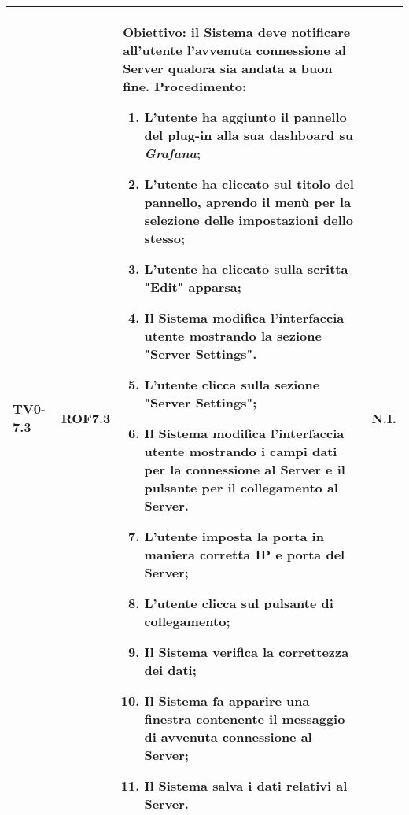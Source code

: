 \begin{longtable}{|C{.15\textwidth}|C{.13\textwidth}|m{.52\textwidth}|C{.08\textwidth}|}
TV0-7.3 & ROF7.3 &
	\textbf{Obiettivo}: il Sistema deve notificare all'utente l'avvenuta connessione al Server qualora sia andata a buon fine. \newline
	\textbf{Procedimento}:
	\begin{enumerate}
		\item L'utente ha aggiunto il pannello del plug-in alla sua dashboard su \textit{Grafana};
		\item L'utente ha cliccato sul titolo del pannello, aprendo il menù per la selezione delle impostazioni dello stesso;
		\item L'utente ha cliccato sulla scritta "Edit" apparsa;
		\item Il Sistema modifica l'interfaccia utente mostrando la sezione "Server Settings".
		\item L'utente clicca sulla sezione "Server Settings";
		\item Il Sistema modifica l'interfaccia utente mostrando i campi dati per la connessione al Server e il pulsante per il collegamento al Server.
		\item L'utente imposta la porta in maniera corretta IP e porta del Server;
		\item L'utente clicca sul pulsante di collegamento;
		\item Il Sistema verifica la correttezza dei dati;
		\item Il Sistema fa apparire una finestra contenente il messaggio di avvenuta connessione al Server;
		\item Il Sistema salva i dati relativi al Server.
	\end{enumerate}
	& N.I. \\
\hline


\end{longtable}
